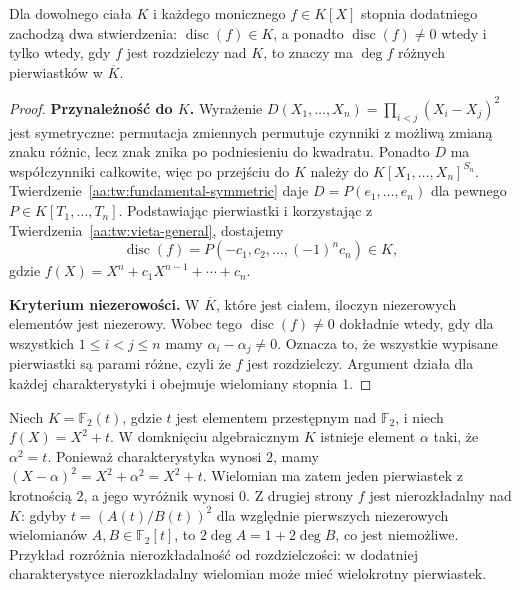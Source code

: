 \begin{twierdzenie}\label{aa:tw:disc-separable}
Dla dowolnego ciała $K$ i każdego monicznego
$f\in K[X]$ stopnia dodatniego zachodzą dwa stwierdzenia:
$\operatorname{disc}(f)\in K$, a ponadto
$\operatorname{disc}(f)\ne0$ wtedy i tylko wtedy,
gdy $f$ jest rozdzielczy nad $K$, to znaczy ma
$\deg f$ różnych pierwiastków w $\overline K$.
\end{twierdzenie}
\begin{proof}
\textbf{Przynależność do $K$.}
Wyrażenie $D(X_1,\ldots,X_n)=
\prod_{i<j}(X_i-X_j)^2$ jest symetryczne:
permutacja zmiennych permutuje czynniki z możliwą
zmianą znaku różnic, lecz znak znika po podniesieniu
do kwadratu. Ponadto $D$ ma współczynniki całkowite,
więc po przejściu do $K$ należy do
$K[X_1,\ldots,X_n]^{S_n}$.
Twierdzenie~\ref{aa:tw:fundamental-symmetric} daje
$D=P(e_1,\ldots,e_n)$ dla pewnego $P\in K[T_1,\ldots,T_n]$.
Podstawiając pierwiastki i korzystając z
Twierdzenia~\ref{aa:tw:vieta-general}, dostajemy
\[
 \operatorname{disc}(f)
 =P(-c_1,c_2,\ldots,(-1)^nc_n)\in K,
\]
gdzie $f(X)=X^n+c_1X^{n-1}+\cdots+c_n$.

\textbf{Kryterium niezerowości.}
W $\overline K$, które jest ciałem, iloczyn
niezerowych elementów jest niezerowy. Wobec tego
$\operatorname{disc}(f)\ne0$ dokładnie wtedy,
gdy dla wszystkich $1\le i<j\le n$ mamy
$\alpha_i-\alpha_j\ne0$. Oznacza to, że wszystkie
wypisane pierwiastki są parami różne, czyli że
$f$ jest rozdzielczy. Argument działa dla każdej
charakterystyki i obejmuje wielomiany stopnia $1$.
\end{proof}

\begin{przyklad}\label{aa:prz:disc-inseparable-char2}
Niech $K=\mathbb F_2(t)$, gdzie $t$ jest elementem
przestępnym nad $\mathbb F_2$, i niech $f(X)=X^2+t$.
W domknięciu algebraicznym $K$ istnieje element $\alpha$
taki, że $\alpha^2=t$. Ponieważ charakterystyka wynosi $2$,
mamy $(X-\alpha)^2=X^2+\alpha^2=X^2+t$.
Wielomian ma zatem jeden pierwiastek z krotnością $2$,
a jego wyróżnik wynosi $0$.
Z drugiej strony $f$ jest nierozkładalny nad $K$:
gdyby $t=(A(t)/B(t))^2$ dla względnie pierwszych
niezerowych wielomianów $A,B\in\mathbb F_2[t]$, to
$2\deg A=1+2\deg B$, co jest niemożliwe.
Przykład rozróżnia nierozkładalność od rozdzielczości:
w dodatniej charakterystyce nierozkładalny wielomian
może mieć wielokrotny pierwiastek.
\end{przyklad}

